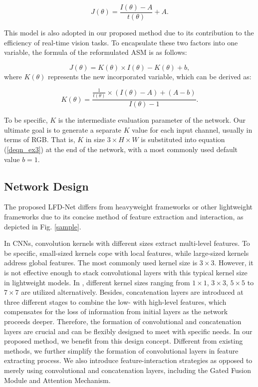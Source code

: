\documentclass[lettersize,journal]{IEEEtran}
\begin{document}
\begin{equation}
    \label{deqn_ex2}
    J(\theta) = \frac{I(\theta) - A}{t(\theta)} + A.
\end{equation}

This model is also adopted in our proposed method due to its contribution to the efficiency of real-time vision tasks. To encapsulate these two factors into one variable, the formula of the reformulated ASM is as follows:

\begin{equation}
    \label{deqn_ex3}
    J(\theta) = K(\theta) \times I(\theta) - K(\theta) + b,
\end{equation}
where $K(\theta)$ represents the new incorporated variable, which can be derived as:

\begin{equation}
    \label{deqn_ex4}
    K(\theta) = \frac{\frac{1}{t(\theta)} \times (I(\theta) - A) + (A - b)}{I(\theta) - 1}.
\end{equation}

To be specific, $K$ is the intermediate evaluation parameter of the network. Our ultimate goal is to generate a separate $K$ value for each input channel, usually in terms of RGB. That is, $K$ in size $3 \times H \times W$ is substituted into equation (\ref{deqn_ex3}) at the end of the network, with a most commonly used default value $b = 1$.

\subsection{Network Design}
The proposed LFD-Net differs from heavyweight frameworks or other lightweight frameworks due to its concise method of feature extraction and interaction, as depicted in Fig. \ref{sample}.

In CNNs, convolution kernels with different sizes extract multi-level features. To be specific, small-sized kernels cope with local features, while large-sized kernels address global features. The most commonly used kernel size is $3 \times 3$. However, it is not effective enough to stack convolutional layers with this typical kernel size in lightweight models. In \cite{ullah2021light}, different kernel sizes ranging from $1\times 1$, $3\times 3$, $5\times 5$ to $7\times 7$ are utilized alternatively. Besides, concatenation layers are introduced at three different stages to combine the low- with high-level features, which compensates for the loss of information from initial layers as the network proceeds deeper. Therefore, the formation of convolutional and concatenation layers are crucial and can be flexibly designed to meet with specific needs. In our proposed method, we benefit from this design concept. Different from existing methods, we further simplify the formation of convolutional layers in feature extracting process. We also introduce feature-interaction strategies as opposed to merely using convolutional and concatenation layers, including the Gated Fusion Module and Attention Mechanism. 
\end{document}
